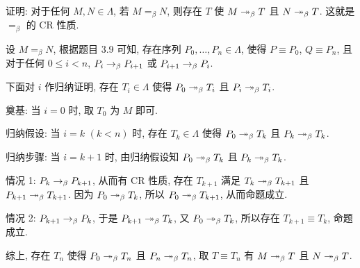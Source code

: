 \begin{problem}
证明: 对于任何 $M, N \in \Lambda$, 若 $M =_\beta N$, 则存在 $T$ 使 $M \twoheadrightarrow_\beta T$ 且 $N \twoheadrightarrow_\beta T$. 这就是 $=_\beta$ 的 CR 性质.
\end{problem}

\begin{solution}
设 $M =_\beta N$, 根据题目 3.9 可知, 存在序列 $P_0, \dots, P_n \in \Lambda$, 使得 $P \equiv P_0$, $Q \equiv P_n$, 且对于任何 $0 \le i < n$, $P_i \rightarrow_\beta P_{i+1}$ 或 $P_{i+1} \rightarrow_\beta P_{i}$.

下面对 $i$ 作归纳证明, 存在 $T_i \in \Lambda$ 使得 $P_0 \twoheadrightarrow_\beta T_i$ 且 $P_i \twoheadrightarrow_\beta T_i$.

奠基: 当 $i=0$ 时, 取 $T_0$ 为 $M$ 即可.

归纳假设: 当 $i=k$ $(k < n)$ 时, 存在 $T_k \in \Lambda$ 使得 $P_0 \twoheadrightarrow_\beta T_k$ 且 $P_k \twoheadrightarrow_\beta T_k$.

归纳步骤: 当 $i = k + 1$ 时, 由归纳假设知 $P_0 \twoheadrightarrow_\beta T_k$ 且 $P_k \twoheadrightarrow_\beta T_k$.

情况 1: $P_k \rightarrow_\beta P_{k+1}$, 从而有 CR 性质, 存在 $T_{k+1}$ 满足 $T_k \twoheadrightarrow_\beta T_{k+1}$ 且 $P_{k+1} \twoheadrightarrow_\beta T_{k+1}$. 因为 $P_0 \twoheadrightarrow_\beta T_k$, 所以 $P_0 \twoheadrightarrow_\beta T_{k+1}$, 从而命题成立.

情况 2: $P_{k+1} \rightarrow_\beta P_k$, 于是 $P_{k+1} \twoheadrightarrow_\beta T_k$, 又 $P_0 \twoheadrightarrow_\beta T_k$, 所以存在 $T_{k+1} \equiv T_k$, 命题成立.

综上, 存在 $T_n$ 使得 $P_0 \twoheadrightarrow_\beta T_n$ 且 $P_n \twoheadrightarrow_\beta T_n$, 取 $T \equiv T_n$ 有 $M \twoheadrightarrow_\beta T$ 且 $N \twoheadrightarrow_\beta T$.
\end{solution}
